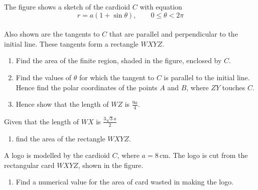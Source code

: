 \documentclass[leqno]{article}
\begin{document}
\begin{enumerate}[
  label=\textbf{\arabic*.},
  leftmargin=*,
  topsep=0pt,
  partopsep=0pt,
  parsep=0pt
]
\begin{figure}[H]
\end{figure}


The figure shows a sketch of the cardioid $C$ with equation
\[
r = a(1 + \sin \theta), \qquad 0 \leq \theta < 2\pi
\]
\\
Also shown are the tangents to $C$ that are parallel and perpendicular to the initial line. These tangents form a rectangle $WXYZ$. \\

\begin{enumerate}[label=\textbf{(\alph*)}]
  \item Find the area of the finite region, shaded in the figure, enclosed by $C$.  \\
  \item Find the values of $\theta$ for which the tangent to $C$ is parallel to the initial line. Hence find the polar coordinates of the points $A$ and $B$, where $ZY$ touches $C$.  \\
  \item Hence show that the length of $WZ$ is $\frac{9a}{4}$.  \\
\end{enumerate}
Given that the length of $WX$ is $\frac{3\sqrt{3}a}{2}$ \\
\begin{enumerate}[label=\textbf{(\alph*)}, resume]
  \item find the area of the rectangle $WXYZ$.  \\
\end{enumerate}
A logo is modelled by the cardioid $C$, where $a = 8\,\mathrm{cm}$. The logo is cut from the rectangular card $WXYZ$, shown in the figure. \\
\begin{enumerate}[label=\textbf{(\alph*)}, resume]
  \item Find a numerical value for the area of card wasted in making the logo.  \\
\end{enumerate}

\vspace*{10pt}


\end{enumerate}
\end{document}
